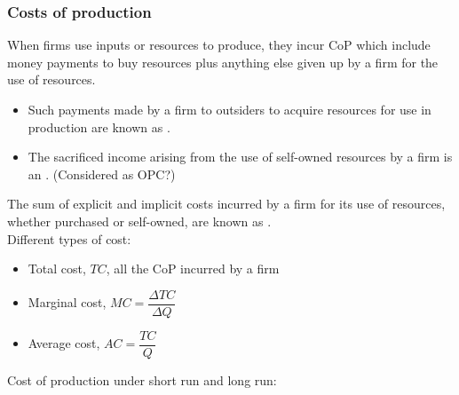 \subsubsection*{Costs of production}
When firms use inputs or resources to produce, they incur CoP which include money payments
to buy resources plus anything else given up by a firm for the use of resources.
\begin{itemize}
  \item Such payments made by a firm to outsiders to acquire resources for use in production are known as .
  \item The sacrificed income arising from the use of self-owned resources by a firm is an . (Considered as OPC?)
\end{itemize}
The sum of explicit and implicit costs incurred by a firm for its use of resources, whether purchased or self-owned, are known as .\\
Different types of cost: 
\begin{itemize}
  \item Total cost, $TC$, all the CoP incurred by a firm
  \item Marginal cost, $MC=\dfrac{\Delta TC}{\Delta Q}$
  \item Average cost, $AC=\dfrac{TC}{Q}$
\end{itemize}
Cost of production under short run and long run:
